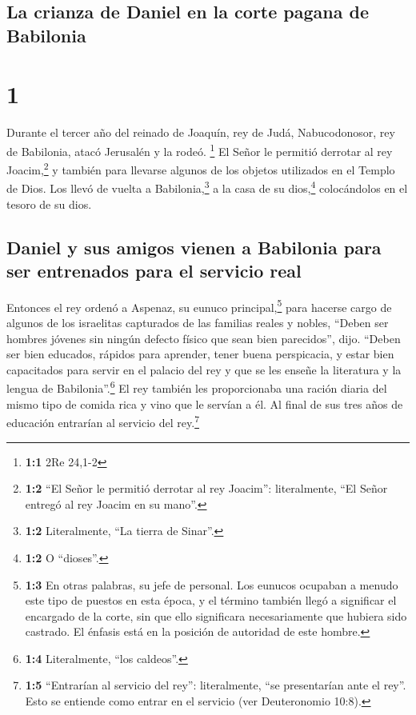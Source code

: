 \hypertarget{la-crianza-de-daniel-en-la-corte-pagana-de-babilonia}{%
\subsection{La crianza de Daniel en la corte pagana de
Babilonia}\label{la-crianza-de-daniel-en-la-corte-pagana-de-babilonia}}

\hypertarget{section}{%
\section{1}\label{section}}

 Durante el tercer año del reinado de Joaquín, rey de
Judá, Nabucodonosor, rey de Babilonia, atacó Jerusalén y la rodeó.
\footnote{\textbf{1:1} 2Re 24,1-2}  El Señor le permitió
derrotar al rey Joacim,\footnote{\textbf{1:2} ``El Señor le permitió
  derrotar al rey Joacim'': literalmente, ``El Señor entregó al rey
  Joacim en su mano''.} y también para llevarse algunos de los objetos
utilizados en el Templo de Dios. Los llevó de vuelta a
Babilonia,\footnote{\textbf{1:2} Literalmente, ``La tierra de Sinar''.}
a la casa de su dios,\footnote{\textbf{1:2} O ``dioses''.} colocándolos
en el tesoro de su dios.

\hypertarget{daniel-y-sus-amigos-vienen-a-babilonia-para-ser-entrenados-para-el-servicio-real}{%
\subsection{Daniel y sus amigos vienen a Babilonia para ser entrenados
para el servicio
real}\label{daniel-y-sus-amigos-vienen-a-babilonia-para-ser-entrenados-para-el-servicio-real}}

 Entonces el rey ordenó a Aspenaz, su eunuco
principal,\footnote{\textbf{1:3} En otras palabras, su jefe de personal.
  Los eunucos ocupaban a menudo este tipo de puestos en esta época, y el
  término también llegó a significar el encargado de la corte, sin que
  ello significara necesariamente que hubiera sido castrado. El énfasis
  está en la posición de autoridad de este hombre.} para hacerse cargo
de algunos de los israelitas capturados de las familias reales y nobles,
 ``Deben ser hombres jóvenes sin ningún defecto físico que
sean bien parecidos'', dijo. ``Deben ser bien educados, rápidos para
aprender, tener buena perspicacia, y estar bien capacitados para servir
en el palacio del rey y que se les enseñe la literatura y la lengua de
Babilonia''.\footnote{\textbf{1:4} Literalmente, ``los caldeos''.}
 El rey también les proporcionaba una ración diaria del
mismo tipo de comida rica y vino que le servían a él. Al final de sus
tres años de educación entrarían al servicio del rey.\footnote{\textbf{1:5}
  ``Entrarían al servicio del rey'': literalmente, ``se presentarían
  ante el rey''. Esto se entiende como entrar en el servicio (ver
  Deuteronomio 10:8).}

